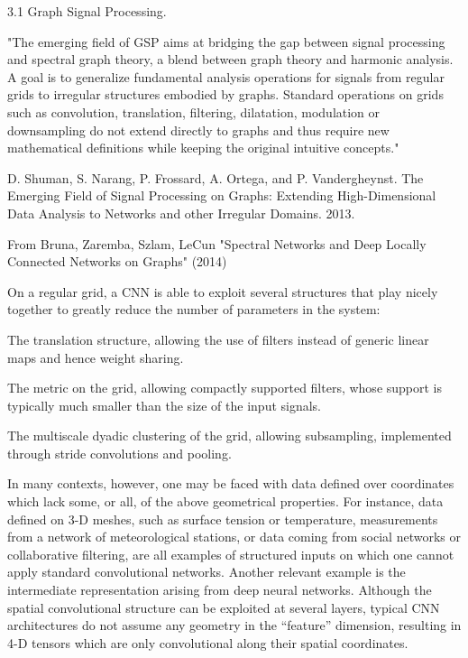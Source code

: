 \documentclass[english]{article}
\begin{document}
\item 3.1 Graph Signal Processing.


"The emerging field of GSP aims at bridging the gap between signal processing and spectral graph theory, a blend between graph theory and harmonic analysis. A goal is to generalize
fundamental analysis operations for signals from regular grids to irregular structures embodied by
graphs. Standard operations on grids
such as convolution, translation, filtering, dilatation, modulation or downsampling do not extend
directly to graphs and thus require new mathematical definitions while keeping the original intuitive
concepts."

D. Shuman, S. Narang, P. Frossard, A. Ortega, and P. Vandergheynst. The Emerging Field of Signal
Processing on Graphs: Extending High-Dimensional Data Analysis to Networks and other Irregular Domains. 2013.

\item From Bruna, Zaremba, Szlam, LeCun "Spectral Networks and Deep Locally Connected Networks on Graphs" (2014)

On a regular grid, a CNN is able to exploit several structures that play nicely together to greatly
reduce the number of parameters in the system:

\bitem 
\item  The translation structure, allowing the use of filters instead of generic linear maps and
hence weight sharing.
\item  The metric on the grid, allowing compactly supported filters, whose support is typically
much smaller than the size of the input signals.
\item  The multiscale dyadic clustering of the grid, allowing subsampling, implemented through
stride convolutions and pooling.
\eitem 


In many contexts, however, one may be faced with data defined over coordinates which lack some,
or all, of the above geometrical properties. For instance, data defined on 3-D meshes, such as
surface tension or temperature, measurements from a network of meteorological stations, or data
coming from social networks or collaborative filtering, are all examples of structured inputs on which
one cannot apply standard convolutional networks. Another relevant example is the intermediate
representation arising from deep neural networks. Although the spatial convolutional structure can
be exploited at several layers, typical CNN architectures do not assume any geometry in the “feature”
dimension, resulting in 4-D tensors which are only convolutional along their spatial coordinates.
\end{document}
